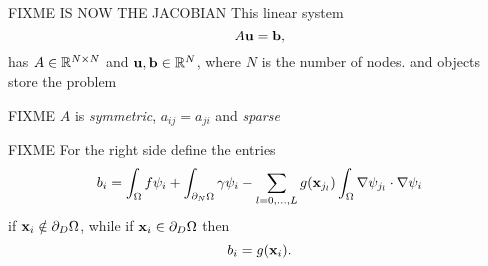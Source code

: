 FIXME IS NOW THE JACOBIAN This linear system
\begin{equation}
A \mathbf{u} = \mathbf{b}, \label{poissonmatrix}
\end{equation}
has $A\in\mathbb{R}^{N\times N}$ and $\mathbf{u},\mathbf{b}\in\mathbb{R}^N$, where $N$ is the number of nodes.  \pMat and \pVec objects store the problem

FIXME $A$ is \emph{symmetric}, $a_{ij}=a_{ji}$ and \emph{sparse}

FIXME For the right side define the entries
\begin{equation}
    b_i = \int_\Omega f \psi_i + \int_{\partial_N\Omega} \gamma \psi_i - \sum_{l=0,\dots,L} g(\mathbf{x}_{j_l})  \int_\Omega \nabla \psi_{j_l} \cdot \nabla \psi_i  \label{bentryfem}
\end{equation}
if $\mathbf{x}_i \notin \partial_D \Omega$, while if $\mathbf{x}_i \in \partial_D \Omega$ then
    $$b_i = g(\mathbf{x}_{i}).$$




